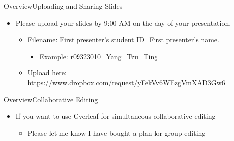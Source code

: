 \documentclass[hyperref={pdfpagelabels=false,hidelinks}]{beamer}
\begin{document}
\begin{frame}{Overview}{Uploading and Sharing Slides}
	\begin{itemize}
		\item Please upload your slides by 9:00 AM on the day of your presentation.
											\vspace{0.2cm}
		\begin{itemize}
			\item Filename: First presenter's student ID\_First presenter's name.
												\vspace{0.2cm}
			\begin{itemize}
				\item Example: r09323010\_Yang\_Tzu\_Ting
													\vspace{0.2cm}
			\end{itemize}
			\item Upload here: \url{https://www.dropbox.com/request/yFekVv6WEzgVmXAD3Gw6}
		\end{itemize}
														\vspace{0.2cm}
	
	\end{itemize}
\end{frame}



\begin{frame}{Overview}{Collaborative Editing}
	\begin{itemize}
		
		\item If you want to use Overleaf for simultaneous collaborative editing
		
		\begin{itemize}
			\vspace{0.2cm}
			\item Please let me know I have bought a plan for group editing
		\end{itemize}
	\end{itemize}
\end{frame}
\end{document}
